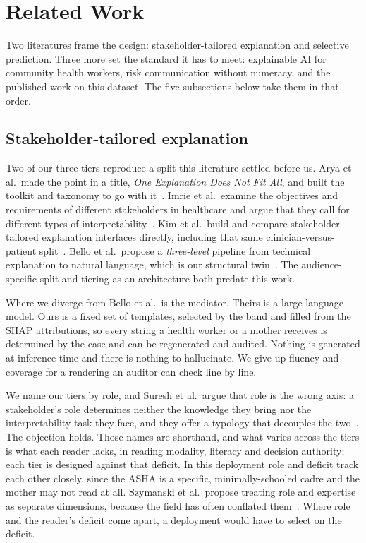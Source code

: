 \section{Related Work}
\label{sec:related}

Two literatures frame the design: stakeholder-tailored explanation and
selective prediction. Three more set the standard it has to meet: explainable
AI for community health workers, risk
communication without numeracy, and the published work on this dataset. The
five subsections below take them in that order.

\subsection{Stakeholder-tailored explanation}
\label{sec:rw-stakeholder}

Two of our three tiers reproduce a split this literature settled before us.
Arya et al.\ made the point in a title, \emph{One Explanation Does Not Fit
All}, and built the toolkit and taxonomy to go with
it~\citep{arya2019explanation}. Imrie et al.\ examine the objectives and
requirements of different stakeholders in healthcare and argue that they call
for different types of interpretability~\citep{imrie2023multiple}. Kim et al.\
build and compare stakeholder-tailored explanation interfaces directly,
including that same clinician-versus-patient
split~\citep{kim2024stakeholder}. Bello et al.\ propose a
\emph{three-level} pipeline from technical explanation to natural language,
which is our structural twin~\citep{bello2025threelevel}. The
audience-specific split and tiering as an architecture both predate this work.

Where we diverge from Bello et al.\ is the mediator. Theirs is a large
language model. Ours is a
fixed set of templates, selected by the band and filled from the SHAP
attributions, so every string a health worker
or a mother receives is determined by the case and can be regenerated and
audited. Nothing is generated at inference time and there is nothing to
hallucinate. We give up fluency and coverage for a rendering an auditor can
check line by line.

We name our tiers by role, and Suresh et al.\ argue that role is the wrong
axis: a stakeholder's role determines neither the knowledge they bring nor the
interpretability task they face, and they offer a typology that decouples the
two~\citep{suresh2021beyond}. The objection holds. Those names are shorthand,
and what varies across the tiers is what each reader lacks, in reading
modality, literacy and decision authority; each tier is designed against that
deficit. In this deployment role and deficit track each other closely, since
the ASHA is a specific, minimally-schooled cadre and the mother may not read
at all. Szymanski et al.\ propose treating role and expertise as separate
dimensions, because the field has often conflated
them~\citep{szymanski2025disentangling}. Where role and the reader's deficit
come apart, a deployment would have to select on the deficit.

